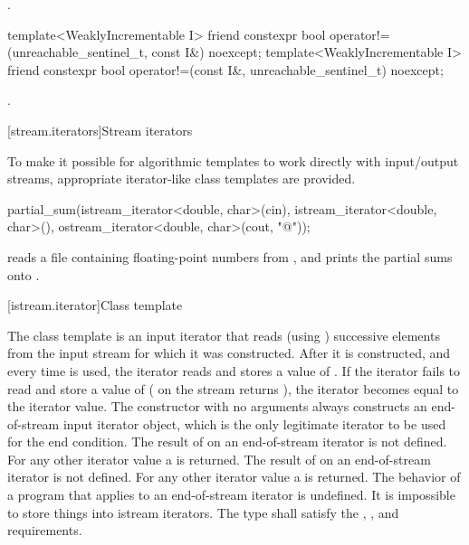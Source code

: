 \begin{itemdescr}
\pnum
\returns {}.
\end{itemdescr}

%
%
\begin{itemdecl}
template<WeaklyIncrementable I>
  friend constexpr bool operator!=(unreachable_sentinel_t, const I&) noexcept;
template<WeaklyIncrementable I>
  friend constexpr bool operator!=(const I&, unreachable_sentinel_t) noexcept;
\end{itemdecl}

\begin{itemdescr}
\pnum
\returns {}.
\end{itemdescr}

[stream.iterators]{Stream iterators}

\pnum
To make it possible for algorithmic templates to work directly with input/output streams, appropriate
iterator-like
class templates
are provided.

\begin{example}
\begin{codeblock}
partial_sum(istream_iterator<double, char>(cin),
  istream_iterator<double, char>(),
  ostream_iterator<double, char>(cout, "@\textbackslash@n"));
\end{codeblock}

reads a file containing floating-point numbers from
,
and prints the partial sums onto
.
\end{example}

[istream.iterator]{Class template }

\pnum
{}%
The class template
is an input iterator that
reads (using
)
successive elements from the input stream for which it was constructed.
After it is constructed, and every time
\tcode{++}
is used, the iterator reads and stores a value of
.
If the iterator fails to read and store a value of 
(
on the stream returns
),
the iterator becomes equal to the
iterator value.
The constructor with no arguments
always constructs
an end-of-stream input iterator object, which is the only legitimate iterator to be used
for the end condition.
The result of
on an end-of-stream iterator is not defined.
For any other iterator value a
is returned.
The result of
on an end-of-stream iterator is not defined.
For any other iterator value a
is returned.
The behavior of a program that applies  to an end-of-stream
iterator is undefined.
It is impossible to store things into istream iterators.
The type  shall satisfy the ,
, and  requirements.

